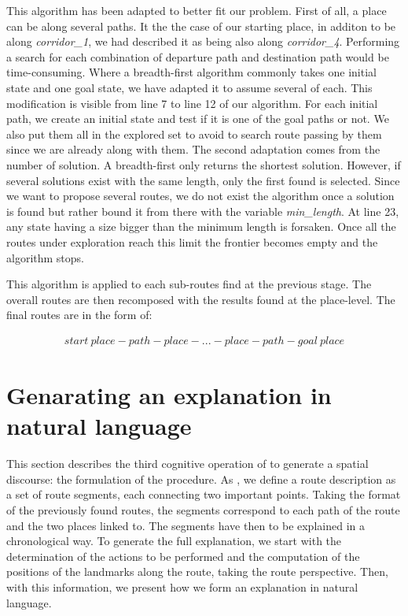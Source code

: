 This algorithm has been adapted to better fit our problem. First of all, a place can be along several paths. It the the case of our starting place, in additon to be along \textit{corridor\_1}, we had described it as being also along \textit{corridor\_4}. Performing a search for each combination of departure path and destination path would be time-consuming. Where a breadth-first algorithm commonly takes one initial state and one goal state, we have adapted it to assume several of each. This modification is visible from line 7 to line 12 of our algorithm. For each initial path, we create an initial state and test if it is one of the goal paths or not. We also put them all in the explored set to avoid to search route passing by them since we are already along with them. The second adaptation comes from the number of solution. A breadth-first only returns the shortest solution. However, if several solutions exist with the same length, only the first found is selected. Since we want to propose several routes, we do not exist the algorithm once a solution is found but rather bound it from there with the variable \textit{min\_length}. At line 23, any state having a size bigger than the minimum length is forsaken. Once all the routes under exploration reach this limit the frontier becomes empty and the algorithm stops.

This algorithm is applied to each sub-routes find at the previous stage. The overall routes are then recomposed with the results found at the place-level. The final routes are in the form of:

\begin{gather*}
start\ place - path - place - ... - place - path - goal\ place
\end{gather*}

\section{Genarating an explanation in natural language}

This section describes the third cognitive operation of \cite{denis_1997_description} to generate a spatial discourse: the formulation of the procedure. As \cite{cassell_2007_trading}, we define a route description as a set of route segments, each connecting two important points. Taking the format of the previously found routes, the segments correspond to each path of the route and the two places linked to. The segments have then to be explained in a chronological way. To generate the full explanation, we start with the determination of the actions to be performed and the computation of the positions of the landmarks along the route, taking the route perspective. Then, with this information, we present how we form an explanation in natural language.

